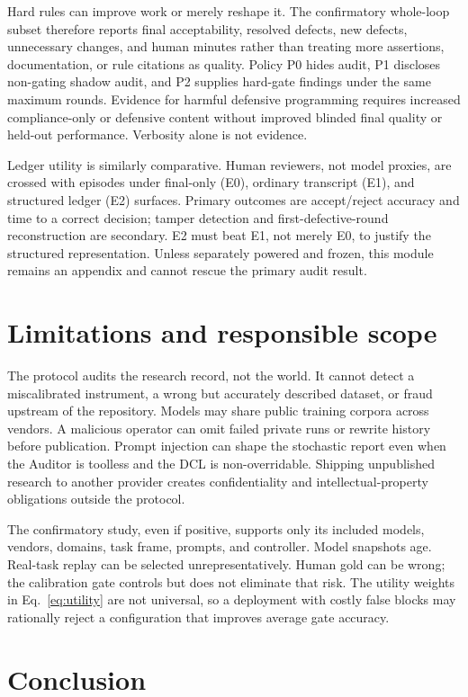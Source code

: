 \documentclass[10pt]{article}
\begin{document}
Hard rules can improve work or merely reshape it. The confirmatory whole-loop
subset therefore reports final acceptability, resolved defects, new defects,
unnecessary changes, and human minutes rather than treating more assertions,
documentation, or rule citations as quality. Policy P0 hides audit, P1
discloses non-gating shadow audit, and P2 supplies hard-gate findings under the
same maximum rounds. Evidence for harmful defensive programming requires
increased compliance-only or defensive content without improved blinded final
quality or held-out performance. Verbosity alone is not evidence.

Ledger utility is similarly comparative. Human reviewers, not model proxies,
are crossed with episodes under final-only (E0), ordinary transcript (E1), and
structured ledger (E2) surfaces. Primary outcomes are accept/reject accuracy
and time to a correct decision; tamper detection and first-defective-round
reconstruction are secondary. E2 must beat E1, not merely E0, to justify the
structured representation. Unless separately powered and frozen, this module
remains an appendix and cannot rescue the primary audit result.

\section{Limitations and responsible scope}

The protocol audits the research record, not the world. It cannot detect a
miscalibrated instrument, a wrong but accurately described dataset, or fraud
upstream of the repository. Models may share public training corpora across
vendors. A malicious operator can omit failed private runs or rewrite history
before publication. Prompt injection can shape the stochastic report even when
the Auditor is toolless and the DCL is non-overridable. Shipping unpublished
research to another provider creates confidentiality and intellectual-property
obligations outside the protocol.

The confirmatory study, even if positive, supports only its included models,
vendors, domains, task frame, prompts, and controller. Model snapshots age.
Real-task replay can be selected unrepresentatively. Human gold can be wrong;
the calibration gate controls but does not eliminate that risk. The utility
weights in Eq.~\ref{eq:utility} are not universal, so a deployment with costly
false blocks may rationally reject a configuration that improves average gate
accuracy.

\section{Conclusion}
\end{document}
